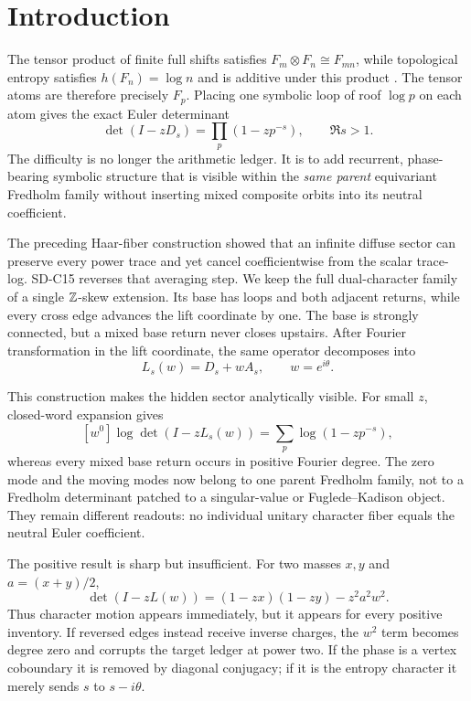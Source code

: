 \section{Introduction}
\label{sec:introduction}

The tensor product of finite full shifts satisfies
$F_m\otimes F_n\cong F_{mn}$, while topological entropy satisfies
$h(F_n)=\log n$ and is additive under this product
\citep{lind1984,delvenne2019}.  The tensor atoms are therefore precisely
$F_p$.  Placing one symbolic loop of roof $\log p$ on each atom gives the
exact Euler determinant
\[
 \det(I-zD_s)=\prod_p(1-zp^{-s}),\qquad \Re s>1.       \tag{1.1}
\]
The difficulty is no longer the arithmetic ledger.  It is to add recurrent,
phase-bearing symbolic structure that is visible within the \emph{same
parent} equivariant Fredholm family without inserting mixed composite orbits
into its neutral coefficient.

The preceding Haar-fiber construction showed that an infinite diffuse sector
can preserve every power trace and yet cancel coefficientwise from the
scalar trace-log.  SD-C15 reverses that averaging step.  We keep the full
dual-character family of a single $\mathbb Z$-skew extension.  Its base has loops
and both adjacent returns, while every cross edge advances the lift
coordinate by one.  The base is strongly connected, but a mixed base return
never closes upstairs.  After Fourier transformation in the lift coordinate,
the same operator decomposes into
\[
 L_s(w)=D_s+wA_s,\qquad w=e^{i\theta}.                 \tag{1.2}
\]

This construction makes the hidden sector analytically visible.  For small
$z$, closed-word expansion gives
\[
 [w^0]\log\det(I-zL_s(w))
  =\sum_p\log(1-zp^{-s}),                              \tag{1.3}
\]
whereas every mixed base return occurs in positive Fourier degree.  The
zero mode and the moving modes now belong to one parent Fredholm family, not
to a Fredholm determinant patched to a singular-value or Fuglede--Kadison
object.  They remain different readouts: no individual unitary character
fiber equals the neutral Euler coefficient.



The positive result is sharp but insufficient.  For two masses $x,y$ and
$a=(x+y)/2$,
\[
 \det(I-zL(w))=(1-zx)(1-zy)-z^2a^2w^2.                \tag{1.4}
\]
Thus character motion appears immediately, but it appears for every positive
inventory.  If reversed edges instead receive inverse charges, the $w^2$
term becomes degree zero and corrupts the target ledger at power two.  If the
phase is a vertex coboundary it is removed by diagonal conjugacy; if it is
the entropy character it merely sends $s$ to $s-i\theta$.

